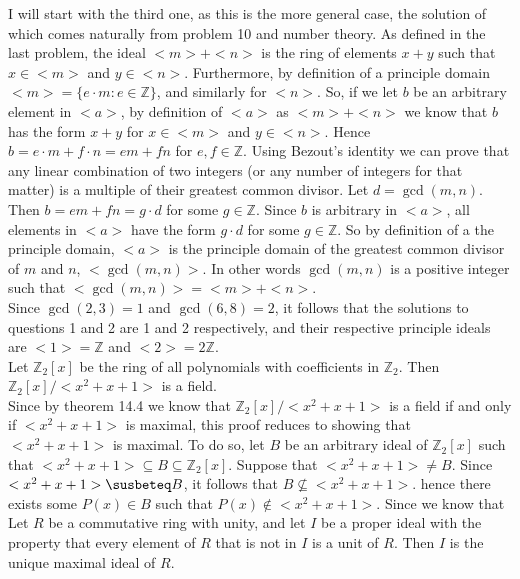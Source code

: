 \documentclass{article}
\newcommand{\Z}{\mathbb{Z}}
\begin{document}
 I will start with the third one, as this is the more general case, the solution of which comes naturally from problem 10 and number theory. As defined in the last problem, the ideal $<m> + <n> $ is the ring of elements $x + y$ such that $x\in <m>$ and $y\in <n>$. Furthermore, by definition of a principle domain $<m> = \{e\cdot m: e\in \Z\}$, and similarly for $<n>$. So, if we let $b$ be an arbitrary element in $<a>$, by definition of $<a>$ as $<m> + <n>$ we know that $b$ has the form $x + y$ for $x\in <m>$ and $y \in <n>$. Hence $b = e\cdot m + f\cdot n = em + fn$ for $e,f\in \Z$. Using Bezout's identity we can prove that any linear combination of two integers (or any number of integers for that matter) is a multiple of their greatest common divisor. Let $d = \gcd(m,n)$. Then $b = em + fn = g\cdot d$ for some $g\in \Z$. Since $b$ is arbitrary in $<a>$, all elements in $<a>$ have the form $g\cdot d$ for some $g\in \Z$. So by definition of a the principle domain, $<a>$ is the principle domain of the greatest common divisor of $m$ and $n$, $<\gcd(m,n)>$. In other words $\gcd(m,n)$ is a positive integer such that $<\gcd(m,n)> = <m>  + <n>$. \\

Since $\gcd(2,3) = 1$ and $\gcd(6,8) =2$, it follows that the solutions to questions 1 and 2 are 1 and 2 respectively, and their respective principle ideals are $<1> = \Z$ and $<2> = 2\Z$.\\


 Let $\Z_2[x]$ be the ring of all polynomials with coefficients in $\Z_2$. Then $\Z_2[x]/<x^2 + x + 1>$ is a field.\\


 Since by theorem 14.4 we know that $\Z_2[x]/<x^2 + x + 1>$ is a field if and only if $<x^2 + x + 1>$ is maximal, this proof reduces to showing that $<x^2 + x + 1>$ is maximal. To do so, let $B$ be an arbitrary ideal of $\Z_2[x]$ such that $<x^2 + x + 1>\subseteq B \subseteq \Z_2[x]$. Suppose that $<x^2 + x + 1> \ne B$. Since $<x^2 + x + 1> \susbeteq B$, it follows that $B \not \subseteq <x^2 + x + 1>$. hence there exists some $P(x)\in B$ such that $P(x) \not \in <x^2 + x + 1>$. Since we know that \\


 Let $R$ be a commutative ring with unity, and let $I$ be a proper ideal with the property that every element of $R$ that is not in $I$ is a unit of $R$. Then $I$ is the unique maximal ideal of $R$.\\
\end{document}
